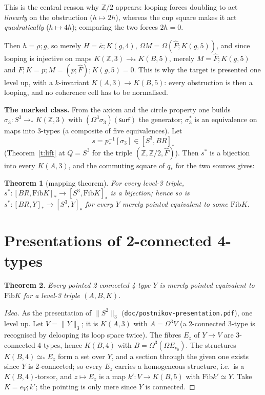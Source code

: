 \documentclass[11pt]{amsart}
\newtheorem{theorem}{Theorem}
\theoremstyle{definition}
\theoremstyle{remark}
\newcommand{\Om}{\Omega}
\newcommand{\Z}{\mathbb{Z}}
\newcommand{\code}[1]{\texttt{#1}}
\newcommand{\hc}[2]{[#1,#2]_*}
\newcommand{\Fib}{\mathrm{Fib}}
\newcommand{\tr}[1]{\|#1\|}
\newcommand{\cls}[1]{[#1]}
\newcommand{\kb}{\bar\kappa}
\newcommand{\Fh}{\hat F}
\begin{document}
\noindent This is the central reason why $\Z/2$ appears: looping forces doubling to act
\emph{linearly} on the obstruction ($h\mapsto2h$), whereas the cup square makes it act
\emph{quadratically} ($h\mapsto4h$); comparing the two forces $2h=0$.

Then $h=\rho;g$, so merely $H=\kb;K(g,4)$, $\Om M=\Om(\Fh;K(g,5))$, and since looping is
injective on maps $K(\Z,3)\to_*K(B,5)$, merely $M=\Fh;K(g,5)$ and
$F;K=p;M=(p;\Fh);K(g,5)=0$. This is why the target is presented one level up, with a
$k$-invariant $K(A,3)\to K(B,5)$: every obstruction is then a looping, and no coherence
cell has to be normalised.

\noindent\textbf{The marked class.} From the axiom and the circle property one builds
$\sigma_3:S^3\to_*K(\Z,3)$ with $(\Om^3\sigma_3)(\mathsf{surf})$ the generator; $\sigma_3^*$
is an equivalence on maps into 3-types (a composite of five equivalences). Let
\[s=p_*^{-1}\cls{\sigma_3}\in\hc{S^3}{BR}\]
(Theorem~\ref{t:lift} at $Q=S^3$ for the triple $(\Z,\Z/2,\Fh)$). Then $s^*$ is a
bijection into every $K(A,3)$, and the commuting square of $q_*$ for the two sources gives:

\begin{theorem}[mapping theorem]\label{t:main}
For every level-3 triple, $s^*:\hc{BR}{\Fib K}\to\hc{S^3}{\Fib K}$ is a bijection; hence
so is $s^*:\hc{BR}Y\to\hc{S^3}Y$ for every $Y$ merely pointed equivalent to some
$\Fib K$.
\end{theorem}

\section{Presentations of 2-connected 4-types}

\begin{theorem}\label{t:pres4}
Every pointed 2-connected 4-type $Y$ is merely pointed equivalent to $\Fib K$ for a
level-3 triple $(A,B,K)$.
\end{theorem}
\begin{proof}[Idea]
As the presentation of $\tr{S^2}_3$ (\code{doc/postnikov-presentation.pdf}), one level up.
Let $V=\tr Y_3$; it is $K(A,3)$ with $A=\Om^3V$ (a 2-connected 3-type is recognised
by delooping its loop space twice). The fibres $E_z$ of $Y\to V$ are 3-connected
4-types, hence $K(B,4)$ with $B=\Om^3(\Om E_{v_0})$. The structures $K(B,4)\simeq_*E_z$
form a set over $Y$, and a section through the given one exists since $Y$ is
2-connected; so every $E_z$ carries a homogeneous structure, i.e.\ is a
$K(B,4)$-torsor, and $z\mapsto E_z$ is a map $k':V\to K(B,5)$ with $\Fib k'\simeq Y$.
Take $K=e_V;k'$; the pointing is only mere since $Y$ is connected.
\end{proof}
\end{document}
